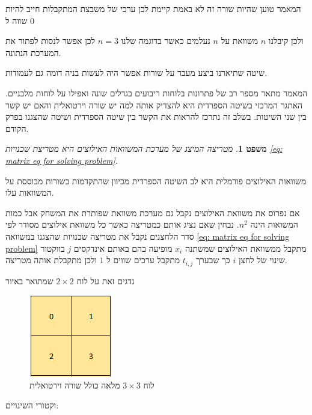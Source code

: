 \documentclass[12pt,twoside]{article}
\newtheorem{theorem}{משפט}[section]
\begin{document}
המאמר טוען שהיות שורה זה לא באמת קיימת לכן
ערכי 
של משבצת המתקבלות 
חייב להיות שווה 
ל
$0$

ולכן קיבלנו 
$n$
משוואת על 
$n$
נעלמים 
כאשר בדוגמה שלנו 
$n=3$
לכן אפשר לנסות לפתור את המערכת הנתונה.

שיטה שתיארנו ביצע מעבר על שורות אפשר היה לעשות בניה דומה גם לעמודות.

המאמר 
\cite{B1}
מתאר מספר רב של פתרונות  בלוחות ריבועים בגדלים שונה ואפילו על לוחות מלבניים.
האתגר המרכזי בשיטה הספרדית היא להצדיק אותה למה יש שורה וירטואלית
והאם יש קשר בין שני השיטות.
בשלב זה נתרכז להראות את הקשר בין שיטה הספרדית ושיטה שהצגנו בפרק הקודם.

\begin{theorem}
    מטריצה המיצג של מערכת המשוואות האילוצים היא מטריצת שכנויות
    \ref{eq: matrix eq for solving problem}.
\end{theorem}
משוואות האילוצים פורמלית היא לב השיטה הספרדית
מכיוון שהתקדמות בשורות מבוססת על המשוואות עלו.

אם נפרוס את משוואת האילוצים נקבל גם מערכת משוואת שפותרת את המשחק
אבל כמות המשואות הינה 
$n^2$.
נבחין שאם נציג אותם כמטריצה כאשר כל משוואת אילוצים מסודר לפי סדר הלחצנים נקבל את מטריצה שכנויות שהצגנו במשוואה 
\ref{eq: matrix eq for solving problem}
מתקבל ממשוואת האילוצים שמשתנה 
$x_i$
מופיעה בהם
באותם אינדקסים 
$j$
בווקטור שינוי
של לחצן 
$i$
כך שבערך 
$t_{i,j}$
מתקבל ערכים 
שווים
ל
$1$
ולכן מתקבלת אותה מטריצה.

נדגים זאת על לוח 
$2 \times 2$
שמתואר באיור 

\begin{figure}[ht]
    \caption{לוח 
    $3 \times 3$
    מלאה
    כולל שורה וירטואלית
    }
    \label{fig: 2 x 2 board}
    \unsethebrew
    \centering
    \includegraphics[width=.3\textwidth,height=.3\textheight,keepaspectratio]{images/2x2_board.PNG}
\end{figure}
\sethebrew

וקטורי השינויים:
\end{document}
